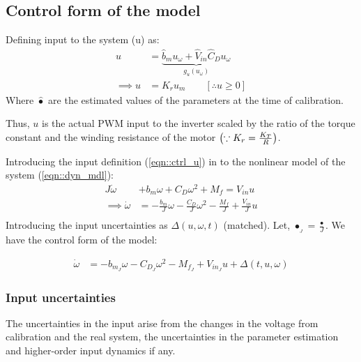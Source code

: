 \subsection{Control form of the model}

Defining input to the system (u) as:
\begin{align}
    u &= \underbrace{\hat b_m u_\omega + \hat V_{in} \hat C_D u_\omega}_{g_u(u_\omega)} \label{eqn::uw2u}\\
    \implies u &= K_r u_m \qquad [\therefore u \geq 0] \label{eqn::ctrl_u}
\end{align}
Where $\hat \bullet$ are the estimated values of the parameters at the time of calibration.

Thus, $u$ is the actual PWM input to the inverter scaled by the ratio of the
torque constant and the winding resistance of the motor $\left( \because K_r =
\frac{K_T}{R} \right)$.

Introducing the input definition (\ref{eqn::ctrl_u}) in to the nonlinear model
of the system (\ref{eqn::dyn_mdl}):
\begin{align*}
    J\dot \omega &+ b_m \omega + C_D \omega^2 + M_f = V_{in} u\\
    \implies \dot \omega  &= -\frac{b_m}{J} \omega - \frac{C_D}{J} \omega^2 - \frac{M_f}{J} + \frac{V_{in}}{J} u\\
\end{align*}
Introducing the input uncertainties as $\Delta(u, \omega, t)$ (matched). Let,
$\bullet_{_J} = \frac{\bullet}{J}$. We have the control form of the model:

\begin{align}
   \dot \omega &= -b_{m_J} \omega - C_{D_J} \omega^2 - M_{f_J} + V_{in_J} u + \Delta(t, u, \omega) \label{eqn::ctrl_form}
\end{align}

\subsubsection{Input uncertainties}
The uncertainties in the input arise from the changes in the voltage from
calibration and the real system, the uncertainties in the parameter estimation
and higher-order input dynamics if any.

